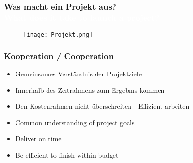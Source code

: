 \documentclass[13pt]{beamer}
\begin{document}
{
\begin{frame}
  \frametitle{Was macht ein Projekt aus? \\ \textcolor{white}{What does it take to launch a project?}}
  \begin{figure}
  \texttt{[image: Projekt.png]}
  \end{figure}
  \bigskip
\end{frame}
}

\begin{frame}
  \frametitle{Kooperation / \textcolor{mfn_green}{Cooperation}}

  \begin{itemize}
  \item{Gemeinsames Verständnis der Projektziele}
  \item{Innerhalb des Zeitrahmens zum Ergebnis kommen}
  \item{Den Kostenrahmen nicht überschreiten - Effizient arbeiten}
  \end{itemize}
  
  \begin{itemize}
  \item{\textcolor{mfn_green}{Common understanding of project goals}}
  \item{\textcolor{mfn_green}{Deliver on time}}
  \item{\textcolor{mfn_green}{Be efficient to finish within budget}}
  \end{itemize}
\end{frame}
\end{document}
